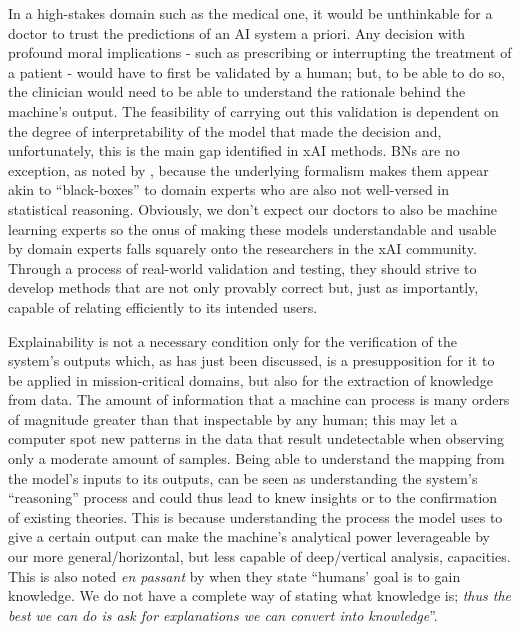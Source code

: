 In a high-stakes domain such as the medical one, it would be unthinkable for a doctor to trust the predictions of an AI system a priori.
Any decision with profound moral implications - such as prescribing or interrupting the treatment of a patient - would have to first be validated by a human; but, to be able to do so, the clinician would need to be able to understand the rationale behind the machine's output. 
The feasibility of carrying out this validation is dependent on the degree of interpretability of the model that made the decision and, unfortunately, this is the main gap identified in xAI methods.
BNs are no exception, as noted by \cite{timmer2015explaining}, because the underlying formalism makes them appear akin to \enquote{black-boxes} to domain experts who are also not well-versed in statistical reasoning.
Obviously, we don't expect our doctors to also be machine learning experts so the onus of making these models understandable and usable by domain experts falls squarely onto the researchers in the xAI community.
Through a process of real-world validation and testing, they should strive to develop methods that are not only provably correct but, just as importantly, capable of relating efficiently to its intended users.

Explainability is not a necessary condition only for the verification of the system's outputs which, as has just been discussed, is a presupposition for it to be applied in mission-critical domains, but also for the extraction of knowledge from data. 
The amount of information that a machine can process is many orders of magnitude greater than that inspectable by any human; this may let a computer spot new patterns in the data that result undetectable when observing only a moderate amount of samples.   
Being able to understand the mapping from the model's inputs to its outputs, can be seen as understanding the system's \enquote{reasoning} process and could thus lead to knew insights or to the confirmation of existing theories.
This is because understanding the process the model uses to give a certain output can make the machine's analytical power leverageable by our more general/horizontal, but less capable of deep/vertical analysis, capacities.
This is also noted \textit{en passant} by \citet{doshi2017towards} when they state \enquote{humans' goal is to gain knowledge. We do not have a complete way of stating what knowledge is; \textit{thus the best we can do is ask for explanations we can convert into knowledge}}.

